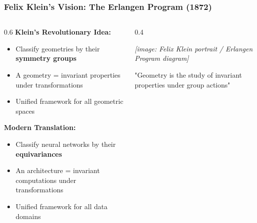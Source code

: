 \begin{frame}[fragile]\frametitle{Felix Klein's Vision: The Erlangen Program (1872)}

\begin{columns}
\begin{column}{0.6\textwidth}
\textbf{Klein's Revolutionary Idea:}
\begin{itemize}
\item Classify geometries by their \textbf{symmetry groups}
\item A geometry = invariant properties under transformations
\item Unified framework for all geometric spaces
\end{itemize}

\vspace{0.5cm}
\textbf{Modern Translation:}
\begin{itemize}
\item Classify neural networks by their \textbf{equivariances}
\item An architecture = invariant computations under transformations  
\item Unified framework for all data domains
\end{itemize}
\end{column}
\begin{column}{0.4\textwidth}
\begin{center}
\textit{[image: Felix Klein portrait / Erlangen Program diagram]}

\vspace{0.5cm}
{\small "Geometry is the study of invariant properties under group actions"}
\end{center}
\end{column}
\end{columns}

\end{frame}

